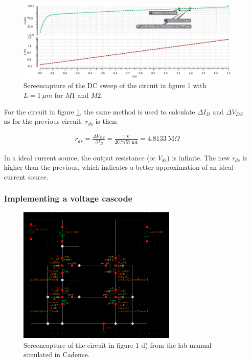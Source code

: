 \documentclass[onecolumn]{article}
\begin{document}
\begin{figure}[h!]
    \centering
    \includegraphics[width=1\textwidth]{plot_circuit_d_FINAL.png}
    \caption{Screencapture of the DC sweep of the circuit in figure 1 with $L = 1 \ \mu m$ for $M1$ and $M2$.}
    \label{fig:plotcnew}
\end{figure}

For the circuit in figure \ref{fig:plotcnew}, the same method is used to calculate $\Delta I_D$ and $\Delta V_{DS}$ as for the previous circuit. $r_{ds}$ is then:

\begin{align}
    r_{ds} = \frac{\Delta V_{DS}}{\Delta  I_D} = \frac{ 1 \ \text{V}}{20.7757 \ \text{nA}} = 4.8133 \ \text{M}\Omega
\end{align}


In a ideal current source, the output resistance (or $V_{ds}$) is infinite. The new $r_{ds}$ is higher than the previous, which indicates a better approximation of an ideal current source.

\clearpage

\subsubsection*{Implementing a voltage cascode}

\begin{figure}[h!]
    \centering
    \includegraphics[width=0.7\textwidth]{circuit_d_cascode.png}
    \caption{Screencapture of the circuit in figure 1 d) from the lab manual simulated in Cadence.}
    \label{fig:circuitd}
\end{figure}
\end{document}
